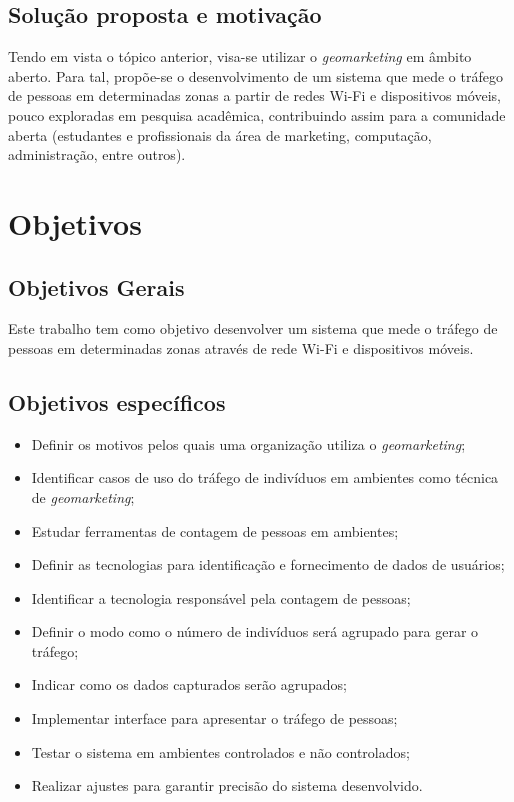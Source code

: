 \subsection{Solução proposta e motivação}
Tendo em vista o tópico anterior, visa-se utilizar o \emph{geomarketing} em
âmbito aberto. Para tal, propõe-se o desenvolvimento de um sistema que mede o
tráfego de pessoas em determinadas zonas a partir de redes Wi-Fi e dispositivos móveis, pouco exploradas em
pesquisa acadêmica, contribuindo assim para a comunidade aberta (estudantes e profissionais da área de
marketing, computação, administração, entre outros).

\section{Objetivos}
\label{objetivos}

\subsection{Objetivos Gerais}
Este trabalho tem como objetivo desenvolver um sistema que mede o tráfego de
pessoas em determinadas zonas através de rede Wi-Fi e dispositivos móveis.

\subsection{Objetivos específicos}
\begin{itemize}
  \item Definir os motivos pelos quais uma organização utiliza o \emph{geomarketing};
  \item Identificar casos de uso do tráfego de indivíduos em ambientes como técnica
  de \emph{geomarketing};
  \item Estudar ferramentas de contagem de pessoas em ambientes;
  \item Definir as tecnologias para identificação e fornecimento de dados de usuários;
  \item Identificar a tecnologia responsável pela contagem de pessoas;
  \item Definir o modo como o número de indivíduos será agrupado para gerar o tráfego;
  \item Indicar como os dados capturados serão agrupados;
  \item Implementar interface para apresentar o tráfego de pessoas;
  \item Testar o sistema em ambientes controlados e não controlados;
  \item Realizar ajustes para garantir precisão do sistema desenvolvido.
\end{itemize}

